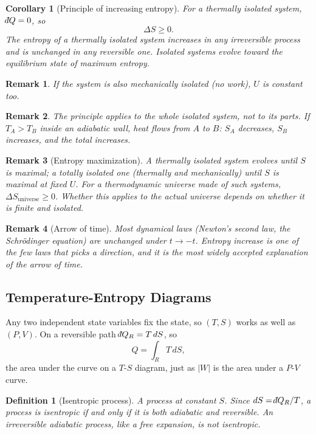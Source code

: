 \documentclass{article}
\newtheorem{corollary}{Corollary}[theorem]
\newtheorem{definition}{Definition}
\newtheorem{remark}{Remark}
\newcommand{\dbar}{\mathchar'26\mkern-12mu d}
\begin{document}
\begin{corollary}[Principle of increasing entropy]
    For a thermally isolated system, $\dbar Q = 0$, so
    \[\Delta S \geq 0.\]
    The entropy of a thermally isolated system increases in any irreversible process and is unchanged in any reversible one. Isolated systems evolve toward the equilibrium state of maximum entropy.
\end{corollary}

\begin{remark}
    If the system is also mechanically isolated (no work), $U$ is constant too.
\end{remark}
\begin{remark}
    The principle applies to the whole isolated system, not to its parts. If $T_A > T_B$ inside an adiabatic wall, heat flows from $A$ to $B$: $S_A$ decreases, $S_B$ increases, and the total increases.
\end{remark}

\begin{remark}[Entropy maximization]
    A thermally isolated system evolves until $S$ is maximal; a totally isolated one (thermally and mechanically) until $S$ is maximal at fixed $U$. For a thermodynamic universe made of such systems, $\Delta S_{\text{universe}} \geq 0$. Whether this applies to the actual universe depends on whether it is finite and isolated.
\end{remark}

\begin{remark}[Arrow of time]
    Most dynamical laws (Newton's second law, the Schr\"odinger equation) are unchanged under $t \to -t$. Entropy increase is one of the few laws that picks a direction, and it is the most widely accepted explanation of the arrow of time.
\end{remark}

\subsection{Temperature-Entropy Diagrams}
Any two independent state variables fix the state, so $(T,S)$ works as well as $(P,V)$. On a reversible path $\dbar Q_R = T\,dS$, so
\[Q = \int_R T\,dS,\]
the area under the curve on a $T$-$S$ diagram, just as $|W|$ is the area under a $P$-$V$ curve.

\begin{definition}[Isentropic process]
    A process at constant $S$. Since $dS = \dbar Q_R/T$, a process is isentropic if and only if it is both adiabatic and reversible. An irreversible adiabatic process, like a free expansion, is not isentropic.
\end{definition}
\end{document}
